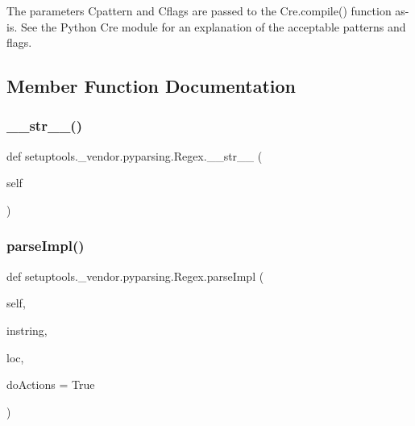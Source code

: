 \begin{DoxyVerb}The parameters C{pattern} and C{flags} are passed to the C{re.compile()} function as-is. See the Python C{re} module for an explanation of the acceptable patterns and flags.\end{DoxyVerb}
 

\subsection{Member Function Documentation}
\mbox{\label{classsetuptools_1_1__vendor_1_1pyparsing_1_1Regex_a2c416a74248d2cf168b3914bd15658e0}} 
\subsubsection{\texorpdfstring{\+\_\+\+\_\+str\+\_\+\+\_\+()}{\_\_str\_\_()}}
{\footnotesize\ttfamily def setuptools.\+\_\+vendor.\+pyparsing.\+Regex.\+\_\+\+\_\+str\+\_\+\+\_\+ (\begin{DoxyParamCaption}\item[{}]{self }\end{DoxyParamCaption})}

\mbox{\label{classsetuptools_1_1__vendor_1_1pyparsing_1_1Regex_a718eded9f697312aab4748ee7dddcd39}} 
\subsubsection{\texorpdfstring{parse\+Impl()}{parseImpl()}}
{\footnotesize\ttfamily def setuptools.\+\_\+vendor.\+pyparsing.\+Regex.\+parse\+Impl (\begin{DoxyParamCaption}\item[{}]{self,  }\item[{}]{instring,  }\item[{}]{loc,  }\item[{}]{do\+Actions = {\ttfamily True} }\end{DoxyParamCaption})}



